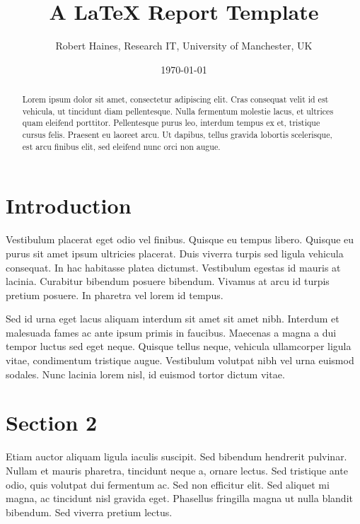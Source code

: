 \documentclass[11pt]{article}
\begin{document}
\title{A {\LaTeX} Report Template}
\author{Robert Haines, Research IT, University of Manchester, UK}
\date{\today}
\maketitle

\begin{abstract}
Lorem ipsum dolor sit amet, consectetur adipiscing elit. Cras consequat velit id est vehicula, ut tincidunt diam pellentesque. Nulla fermentum molestie lacus, et ultrices quam eleifend porttitor. Pellentesque purus leo, interdum tempus ex et, tristique cursus felis. Praesent eu laoreet arcu. Ut dapibus, tellus gravida lobortis scelerisque, est arcu finibus elit, sed eleifend nunc orci non augue.
\end{abstract}

\section{Introduction}

Vestibulum placerat eget odio vel finibus. Quisque eu tempus libero. Quisque eu purus sit amet ipsum ultricies placerat. Duis viverra turpis sed ligula vehicula consequat. In hac habitasse platea dictumst. Vestibulum egestas id mauris at lacinia. Curabitur bibendum posuere bibendum. Vivamus at arcu id turpis pretium posuere. In pharetra vel lorem id tempus.

Sed id urna eget lacus aliquam interdum sit amet sit amet nibh. Interdum et malesuada fames ac ante ipsum primis in faucibus. Maecenas a magna a dui tempor luctus sed eget neque. Quisque tellus neque, vehicula ullamcorper ligula vitae, condimentum tristique augue. Vestibulum volutpat nibh vel urna euismod sodales. Nunc lacinia lorem nisl, id euismod tortor dictum vitae.

\section{Section 2}

Etiam auctor aliquam ligula iaculis suscipit. Sed bibendum hendrerit pulvinar. Nullam et mauris pharetra, tincidunt neque a, ornare lectus. Sed tristique ante odio, quis volutpat dui fermentum ac. Sed non efficitur elit. Sed aliquet mi magna, ac tincidunt nisl gravida eget. Phasellus fringilla magna ut nulla blandit bibendum. Sed viverra pretium lectus.
\end{document}
